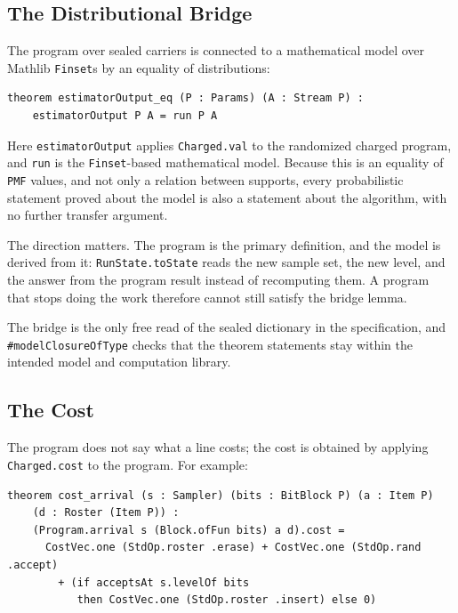 \documentclass[acmsmall,nonacm]{acmart}
\begin{document}
\subsection{The Distributional Bridge}\label{sec:bridge}

The program over sealed carriers is connected to a mathematical model over Mathlib \lstinline{Finset}s by an equality of distributions:

\begin{lstlisting}
theorem estimatorOutput_eq (P : Params) (A : Stream P) :
    estimatorOutput P A = run P A
\end{lstlisting}

Here \lstinline{estimatorOutput} applies \lstinline{Charged.val} to the randomized charged program, and \lstinline{run} is the \lstinline{Finset}-based mathematical model.
Because this is an equality of \lstinline{PMF} values, and not only a relation between supports, every probabilistic statement proved about the model is also a statement about the algorithm, with no further transfer argument.

The direction matters.
The program is the primary definition, and the model is derived from it: \lstinline{RunState.toState} reads the new sample set, the new level, and the answer from the program result instead of recomputing them.
A program that stops doing the work therefore cannot still satisfy the bridge lemma.

The bridge is the only free read of the sealed dictionary in the specification, and \lstinline{#modelClosureOfType} checks that the theorem statements stay within the intended model and computation library.

\subsection{The Cost}\label{sec:cost}

The program does not say what a line costs; the cost is obtained by applying \lstinline{Charged.cost} to the program.
For example:

\begin{lstlisting}
theorem cost_arrival (s : Sampler) (bits : BitBlock P) (a : Item P)
    (d : Roster (Item P)) :
    (Program.arrival s (Block.ofFun bits) a d).cost =
      CostVec.one (StdOp.roster .erase) + CostVec.one (StdOp.rand .accept)
        + (if acceptsAt s.levelOf bits
           then CostVec.one (StdOp.roster .insert) else 0)
\end{lstlisting}
\end{document}
